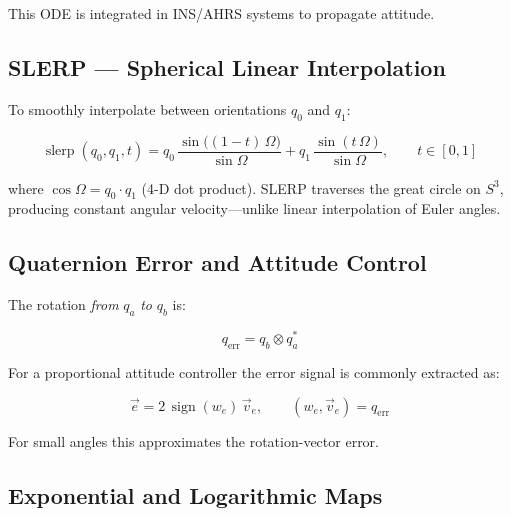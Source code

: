 \documentclass[12pt,a4paper]{article}
\begin{document}
This ODE is integrated in INS/AHRS systems to propagate attitude.

\subsection{SLERP --- Spherical Linear Interpolation}

To smoothly interpolate between orientations $q_0$ and $q_1$:

\begin{equation}
  \operatorname{slerp}(q_0,q_1,t)
  = q_0\,\frac{\sin\bigl((1-t)\,\Omega\bigr)}{\sin\Omega}
  + q_1\,\frac{\sin(t\,\Omega)}{\sin\Omega},
  \qquad t\in[0,1]
\end{equation}

where $\cos\Omega = q_0 \cdot q_1$ (4-D dot product). SLERP traverses the
great circle on $S^3$, producing constant angular velocity---unlike linear
interpolation of Euler angles.

\subsection{Quaternion Error and Attitude Control}

The rotation \emph{from} $q_a$ \emph{to} $q_b$ is:

\begin{equation}
  q_{\text{err}} = q_b \otimes q_a^{*}
\end{equation}

For a proportional attitude controller the error signal is commonly
extracted as:

\begin{equation}
  \vec{e} = 2\,\operatorname{sign}(w_e)\,\vec{v}_e,
  \qquad (w_e,\vec{v}_e) = q_{\text{err}}
\end{equation}

For small angles this approximates the rotation-vector error.

\subsection{Exponential and Logarithmic Maps}
\end{document}
